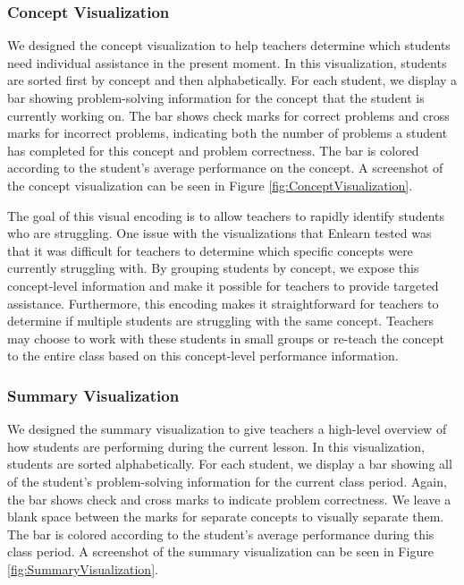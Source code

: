 \documentclass{sigchi}
\begin{document}
\subsubsection{Concept Visualization}
We designed the concept visualization to help teachers determine which students need individual assistance in the present moment. In this visualization, students are sorted first by concept and then alphabetically. For each student, we display a bar showing problem-solving information for the concept that the student is currently working on. The bar shows check marks for correct problems and cross marks for incorrect problems, indicating both the number of problems a student has completed for this concept and problem correctness. The bar is colored according to the student's average performance on the concept. A screenshot of the concept visualization can be seen in Figure \ref{fig:ConceptVisualization}.

The goal of this visual encoding is to allow teachers to rapidly identify students who are struggling. One issue with the visualizations that Enlearn tested was that it was difficult for teachers to determine which specific concepts were currently struggling with. By grouping students by concept, we expose this concept-level information and make it possible for teachers to provide targeted assistance. Furthermore, this encoding makes it straightforward for teachers to determine if multiple students are struggling with the same concept. Teachers may choose to work with these students in small groups or re-teach the concept to the entire class based on this concept-level performance information.

\subsubsection{Summary Visualization}
We designed the summary visualization to give teachers a high-level overview of how students are performing during the current lesson. In this visualization, students are sorted alphabetically. For each student, we display a bar showing all of the student's problem-solving information for the current class period. Again, the bar shows check and cross marks to indicate problem correctness. We leave a blank space between the marks for separate concepts to visually separate them. The bar is colored according to the student's average performance during this class period. A screenshot of the summary visualization can be seen in Figure \ref{fig:SummaryVisualization}.
\end{document}
